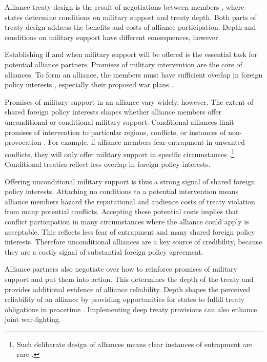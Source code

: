 \documentclass[12pt]{article}
\begin{document}
Alliance treaty design is the result of negotiations between members \citep{Poast2019a}, where states determine conditions on military support and treaty depth.
Both parts of treaty design address the benefits and costs of alliance participation. 
Depth and conditions on military support have different consequences, however. 


Establishing if and when military support will be offered is the essential task for potential alliance partners. 
Promises of military intervention are the core of alliances. 
To form an alliance, the members must have sufficient overlap in foreign policy interests \citep{Morrow1991, Smith1995, FordhamPoast2014}, especially their proposed war plans \citep{Poast2019a}.  


Promises of military support in an alliance vary widely, however. 
The extent of shared foreign policy interests shapes whether alliance members offer unconditional or conditional military support.
Conditional alliances limit promises of intervention to particular regions, conflicts, or instances of non-provocation \citep{Leedsetal2000}. 
For example, if alliance members fear entrapment in unwanted conflicts, they will only offer military support in specific circumstances \citep{Kim2011, Benson2012}.\footnote{Such deliberate design of alliances means clear instances of entrapment are rare \citep{Kim2011, Beckley2015}.} 
Conditional treaties reflect less overlap in foreign policy interests. 


Offering unconditional military support is thus a strong signal of shared foreign policy interests. 
Attaching no conditions to a potential intervention means alliance members hazard the reputational \citep{Gibler2008, Crescenzietal2012} and audience \citep{Fearon1997} costs of treaty violation from many potential conflicts. 
Accepting these potential costs implies that conflict participation in many circumstances where the alliance could apply is acceptable.
This reflects less fear of entrapment and many shared foreign policy interests. 
Therefore unconditional alliances are a key source of credibility, because they are a costly signal of substantial foreign policy agreement. 


Alliance partners also negotiate over how to reinforce promises of military support and put them into action. 
This determines the depth of the treaty and provides additional evidence of alliance reliability. 
Depth shapes the perceived reliability of an alliance by providing opportunities for states to fulfill treaty obligations in peacetime \citep{Morrow1994}. 
Implementing deep treaty provisions can also enhance joint war-fighting. 
\end{document}
